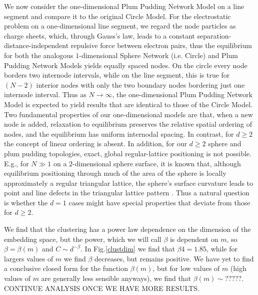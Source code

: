 \documentclass[aps,pre,manuscript,superscriptaddress,amsmath,amssymb,nofootinbib]{revtex4-1}
\begin{document}
We now consider the one-dimensional Plum Pudding Network Model on a line segment and compare it to the original Circle Model.
For the electrostatic problem on a one-dimensional line segment, we regard the node particles as charge sheets, which, through Gauss's law, leads to a constant separation-distance-independent repulsive force between electron pairs, thus the equilibrium for both the analogous $1$-dimensional Sphere Network (i.e. Circle) and Plum Pudding Network Models yields equally spaced nodes. 
On the circle every node borders two internode intervals, while on the line segment, this is true for $(N-2)$ interior nodes with only the two boundary nodes bordering just one internode interval.
Thus as $N \to \infty$, the one-dimensional Plum Pudding Network Model is expected to yield results that are identical to those of the Circle Model.
Two fundamental properties of our one-dimensional models are that, when a new node is added, relaxation to equilibrium preserves the relative spatial ordering of nodes, and the equilibrium has uniform internodal spacing.
In contrast, for $d \geq 2$ the concept of linear ordering is absent.
In addition, for our $d \geq 2$ sphere and plum pudding topologies, exact, global regular-lattice positioning is not possible.
E.g., for $N \gg 1$ on a $2$-dimensional sphere surface, it is known that, although equilibrium positioning through much of the area of the sphere is locally approximately a regular triangular lattice, the sphere's surface curvature leads to point and line defects in the triangular lattice pattern \cite{nelson}.
Thus a natural question is whether the $d = 1$ cases might have special properties that deviate from those for $d \geq 2$.

We find that the clustering has a power law dependence on the dimension of the embedding space, but the power, which we will call $\beta$ is dependent on $m$, so $\beta = \beta(m)$ and $C \sim d^{-\beta}$.
In Fig.\ref{clustdim} we find that $\beta{4} = 1.85$, while for largers values of $m$ we find $\beta$ decreases, but remains positive.
We have yet to find a conclusive closed form for the function $\beta(m)$, but for low values of $m$ (high values of $m$ are generally less sensible anyways), we find that $\beta(m) \sim ?????$.
CONTINUE ANALYSIS ONCE WE HAVE MORE RESULTS.
\end{document}
